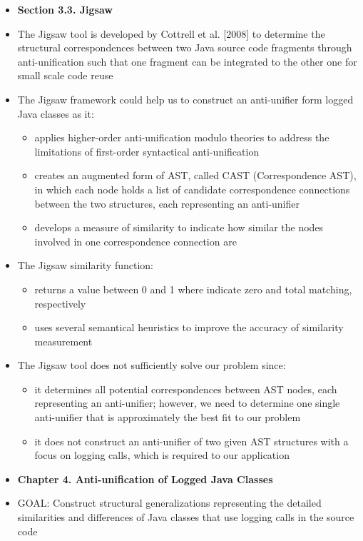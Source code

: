 \documentclass{article}
\newcommand{\bold}{\textbf}
\newcommand{\tsc}{\textsc}
\begin{document}
\begin{itemize} [leftmargin=.1in]
\item \bold{Section 3.3. Jigsaw}
\item The Jigsaw tool is developed by Cottrell et al. [2008] to determine the structural correspondences between two Java source code fragments through anti-unification such that one fragment can be integrated to the other one for small scale code reuse
\item The Jigsaw framework could help us to construct an anti-unifier form logged Java classes as it:
\begin{itemize}
\item applies higher-order anti-unification modulo theories to address the limitations of first-order syntactical anti-unification
\item creates an augmented form of AST, called CAST (Correspondence AST), in which each node holds a list of candidate correspondence connections between the two structures, each representing an anti-unifier
\item develops a measure of similarity to indicate how similar the nodes involved in one correspondence connection are

\end{itemize}
\item The Jigsaw similarity function:
\begin{itemize}
\item returns a value between 0 and 1 where indicate zero and total matching, respectively
\item uses several semantical heuristics to improve the accuracy of similarity measurement

\end{itemize}

\item The Jigsaw tool does not sufficiently solve our problem since:
\begin{itemize}
\item it determines all potential correspondences between AST nodes, each representing an anti-unifier; however, we need to determine one single anti-unifier that is approximately the best fit to our problem
\item it does not construct an anti-unifier of two given AST structures with a focus on logging calls, which is required to our application
\end{itemize}

\item \bold{Chapter 4. Anti-unification of Logged Java Classes}
\item \tsc{GOAL: }Construct structural generalizations representing the detailed similarities and differences of Java classes that use logging calls in the source code


\end{itemize}
\end{document}
